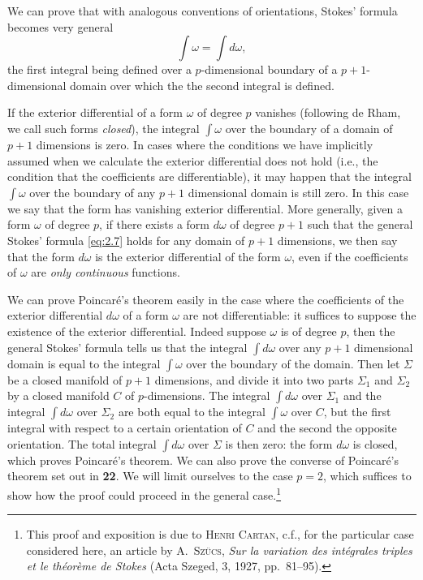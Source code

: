 \documentclass[leqno,11pt]{book}
\numberwithin{equation}{chapter}
\theoremstyle{shape1}
\theoremstyle{shape0}
\theoremstyle{shape2}
\theoremstyle{definition}
\begin{document}
We can prove that with analogous conventions of orientations, Stokes' formula becomes very general
\[
\int \omega=\int d\omega,
\]
the first integral being defined over a $p$-dimensional boundary of a $p+1$-dimensional domain over which the the second integral is defined.

\vspace{12pt}\fsec If the exterior differential of a form $\omega$ of degree $p$ vanishes (following de Rham, we call such forms \emph{closed}), the integral $\int\omega$ over the boundary of a domain of $p+1$ dimensions is zero. In cases where the conditions we have implicitly assumed when we calculate the exterior differential does not hold ({i.e.}, the condition that the coefficients are differentiable), it may happen that the integral $\int \omega$ over the boundary of any $p+1$ dimensional domain is still zero.  In this case we say that the form has vanishing exterior differential. More generally, given a form $\omega$ of degree $p$, if there exists a form $d\omega$ of degree $p+1$ such that the general Stokes' formula \eqref{eq:2.7} holds for any domain of $p+1$ dimensions, we then say that the form $d\omega$ is the exterior differential of the form $\omega$, even if the coefficients of $\omega$ are \emph{only continuous} functions.

\vspace{12pt}\fsec We can prove Poincar\'e's theorem easily in the case where the coefficients of the exterior differential $d\omega$ of a form $\omega$ are not differentiable: it suffices to suppose the existence of the exterior differential. Indeed suppose $\omega$ is of degree $p$, then the general Stokes' formula tells us that the integral $\int d\omega$ over any $p+1$ dimensional domain is equal to the integral $\int \omega$ over the boundary of the domain. Then let $\Sigma$ be a closed manifold of $p+1$ dimensions, and divide it into two parts $\Sigma_{1}$ and $\Sigma_{2}$ by a closed manifold $C$ of $p$-dimensions. The integral $\int d\omega$ over $\Sigma_{1}$ and the integral $\int d\omega$ over $\Sigma_{2}$ are both equal to the integral $\int \omega$ over $C$, but the first integral with respect to a certain orientation of $C$ and the second the opposite orientation. The total integral $\int d\omega$ over $\Sigma$ is then zero: the form $d\omega$ is closed, which proves Poincar\'e's theorem.
\vspace{12pt}\fsec {}We can also prove the converse of Poincar\'e's theorem set out in \textsection
\textbf{22}. We will limit ourselves to the case $p=2$, which suffices to show how the proof could proceed in the general case.\footnote{This proof and exposition is due to \textsc{Henri Cartan}, {c.f.}, for the particular case considered here, an article by \textsc{A.~Sz\"ucs}, \emph{Sur la variation des int\'egrales triples et le th\'eor\`eme de Stokes} (Acta Szeged, 3, 1927, pp.~81--95).}
\end{document}
